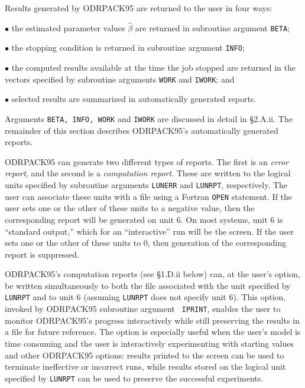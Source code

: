 \bigskip{}
\medskip
\noindent Results generated by ODRPACK95 are returned to the user in four ways:
\item{$\bullet$} the estimated parameter values $\hat{\beta}$ are returned in subroutine argument {\tt BETA};
\item{$\bullet$} the stopping condition is returned in subroutine argument {\tt INFO}; 
\item{$\bullet$} the computed results available at the time the job stopped are returned in the vectors specified by subroutine arguments {\tt WORK} and {\tt IWORK}; and
\item{$\bullet$} selected results are summarized in automatically generated reports.

\noindent Arguments {\tt BETA, INFO, WORK} and {\tt IWORK} are discussed in
detail in \S 2.A.ii. The remainder of this section describes ODRPACK95's automatically generated reports.

\noindent ODRPACK95 can generate two different types of reports. The first is an {\it error report}, and the second is a {\it computation report}. These are written to the logical units specified by subroutine arguments {\tt LUNERR} and {\tt LUNRPT}, respectively. The user can associate these units with a file using a Fortran {\tt OPEN} statement. If the user sets one or the other of these units to a negative value, then the corresponding report will be generated on unit 6. On most systems, unit 6 is ``standard output,'' which for an ``interactive'' run will be the screen. If the user sets one or the other of these units to 0, then generation of the corresponding report is suppressed.

\noindent ODRPACK95's computation reports (see \S 1.D.ii below) can, at the
user's option, be written simultaneously to both the file associated with the
unit specified by {\tt LUNRPT} and to unit 6 (assuming {\tt LUNRPT} does not
specify unit 6). This option, invoked by ODRPACK95 subroutine argument {\tt
IPRINT}, enables the user to monitor ODRPACK95's progress interactively while
still preserving the results in a file for future reference. The option is
especially useful when the user's model is time consuming and the user is
interactively experimenting with starting values and other ODRPACK95 options: results printed to the screen can be used to terminate ineffective or incorrect runs, while results stored on the logical unit specified by {\tt LUNRPT} can be used to preserve the successful experiments.

